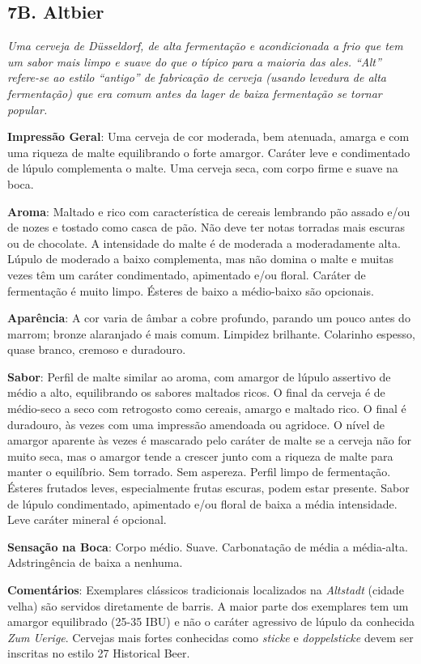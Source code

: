 \subsection*{7B. Altbier}
\textit{Uma cerveja de Düsseldorf, de alta fermentação e acondicionada a frio que tem um sabor mais limpo e suave do que o típico para a maioria das ales. “Alt” refere-se ao estilo “antigo” de fabricação de cerveja (usando levedura de alta fermentação) que era comum antes da lager de baixa fermentação se tornar popular.}

\textbf{Impressão Geral}: Uma cerveja de cor moderada, bem atenuada, amarga e com uma riqueza de malte equilibrando o forte amargor. Caráter leve e condimentado de lúpulo complementa o malte. Uma cerveja seca, com corpo firme e suave na boca.

\textbf{Aroma}: Maltado e rico com característica de cereais lembrando pão assado e/ou de nozes e tostado como casca de pão. Não deve ter notas torradas mais escuras ou de chocolate. A intensidade do malte é de moderada a moderadamente alta. Lúpulo de moderado a baixo complementa, mas não domina o malte e muitas vezes têm um caráter condimentado, apimentado e/ou floral. Caráter de fermentação é muito limpo. Ésteres de baixo a médio-baixo são opcionais.

\textbf{Aparência}: A cor varia de âmbar a cobre profundo, parando um pouco antes do marrom; bronze alaranjado é mais comum. Limpidez brilhante. Colarinho espesso, quase branco, cremoso e duradouro.

\textbf{Sabor}: Perfil de malte similar ao aroma, com amargor de lúpulo assertivo de médio a alto, equilibrando os sabores maltados ricos. O final da cerveja é de médio-seco a seco com retrogosto como cereais, amargo e maltado rico. O final é duradouro, às vezes com uma impressão amendoada ou agridoce. O nível de amargor aparente às vezes é mascarado pelo caráter de malte se a cerveja não for muito seca, mas o amargor tende a crescer junto com a riqueza de malte para manter o equilíbrio. Sem torrado. Sem aspereza. Perfil limpo de fermentação. Ésteres frutados leves, especialmente frutas escuras, podem estar presente. Sabor de lúpulo condimentado, apimentado e/ou floral de baixa a média intensidade. Leve caráter mineral é opcional.

\textbf{Sensação na Boca}: Corpo médio. Suave. Carbonatação de média a média-alta. Adstringência de baixa a nenhuma.

\textbf{Comentários}: Exemplares clássicos tradicionais localizados na \textit{Altstadt} (cidade velha) são servidos diretamente de barris. A maior parte dos exemplares tem um amargor equilibrado (25-35 IBU) e não o caráter agressivo de lúpulo da conhecida \textit{Zum Uerige}. Cervejas mais fortes conhecidas como \textit{sticke} e \textit{doppelsticke} devem ser inscritas no estilo 27 Historical Beer.

